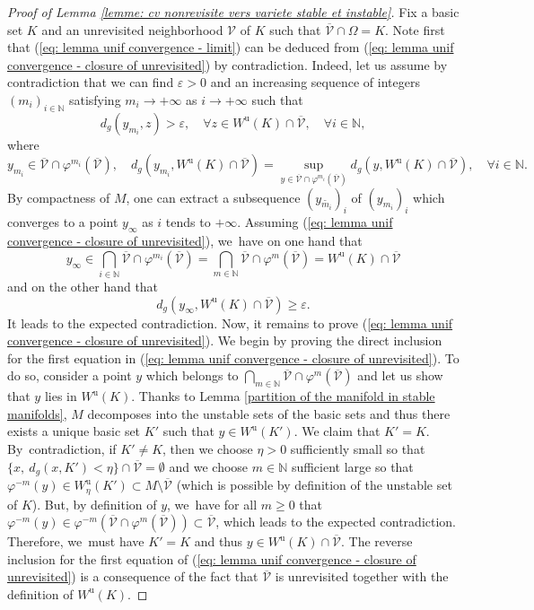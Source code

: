 \documentclass[JEP,XML,SOM,Unicode,NoEqCountersInSection,NoFloatCountersInSection,published]{cedram}
\newcommand{\ru}{\mathrm{u}}
\theoremstyle{definition}
\theoremstyle{plain}
\newcommand{\N}{\mathbb{N}}
\newcommand{\Vcal}{\mathcal{V}}
\begin{document}
\begin{proof}[Proof of Lemma \ref{lemme: cv nonrevisite vers variete stable et instable}]
Fix a basic set $K$ and an unrevisited neighborhood $\Vcal$ of $K$ such that $\overline{\Vcal} \cap \Omega = K$. Note first that (\ref{eq: lemma unif convergence - limit}) can be deduced from (\ref{eq: lemma unif convergence - closure of unrevisited}) by contradiction. Indeed, let us assume by contradiction that we can find $\varepsilon > 0$ and an increasing sequence of integers $(m_i)_{i \in \N}$ satisfying $m_i \to +\infty$ as $i \to +\infty$ such that
\[
d_g (y_{m_i},z) > \varepsilon, \quad \forall z \in W^\ru (K) \cap \overline{\Vcal}, \quad \forall i \in \N,
\]
where
\[
y_{m_i} \in \overline{\Vcal} \cap \varphi^{m_i} (\overline{\Vcal}), \quad d_g (y_{m_i},W^{\ru} (K) \cap \overline{\Vcal}) = \sup_{y \in \overline{\Vcal} \cap \varphi^{m_i} (\overline{\Vcal})} d_g \left(y, W^{\ru} (K) \cap \overline{\Vcal} \right), \quad \forall i \in \N.
\]
By compactness of $M$, one can extract a subsequence $(y_{\widetilde{m_i}})_i$ of $(y_{m_i})_i$ which converges to a point $y_{\infty}$ as $i$ tends to $+\infty$. Assuming (\ref{eq: lemma unif convergence - closure of unrevisited}), we~have on one hand that
\[
y_{\infty} \in \bigcap_{i \in \N} \overline{\Vcal} \cap \varphi^{m_i} (\overline{\Vcal}) = \bigcap_{m \in \N} \overline{\Vcal} \cap \varphi^{m} (\overline{\Vcal}) = W^\ru (K) \cap \overline{\Vcal}
\]
and on the other hand that
\[
d_g (y_{\infty}, W^\ru (K) \cap \overline{\Vcal}) \geq \varepsilon.
\]
It leads to the expected contradiction. Now, it remains to prove (\ref{eq: lemma unif convergence - closure of unrevisited}). We begin by proving the direct inclusion for the first equation in (\ref{eq: lemma unif convergence - closure of unrevisited}). To do so, consider a point $y$ which belongs to $\bigcap_{m \in \N} \overline{\Vcal} \cap \varphi^m (\overline{\Vcal})$ and let us show that $y$ lies in $W^\ru (K)$. Thanks to Lemma \ref{partition of the manifold in stable manifolds}, $M$ decomposes into the unstable sets of the basic sets and thus there exists a unique basic set $K'$ such that $ y \in W^\ru (K')$. We claim that $K' = K$. By~contradiction, if $K' \neq K$, then we choose $\eta > 0$ sufficiently small so that $\{x, \: d_g(x,K') < \eta\} \cap \overline{\Vcal} = \emptyset$ and we choose $m \in \N$ sufficient large so that $\varphi^{-m} (y) \in W_{\eta}^\ru (K') \subset M \setminus \overline{\Vcal}$ (which is possible by definition of the unstable set of $K$). But, by definition of $y$, we~have for all $m \geq 0$ that $\varphi^{-m} (y) \in \varphi^{-m} (\overline{\Vcal} \cap \varphi^m (\overline{\Vcal})) \subset \overline{\Vcal}$, which leads to the expected contradiction. Therefore, we~must have $K' = K$ and thus $y \in W^\ru (K) \cap \overline{\Vcal}$. The reverse inclusion for the first equation of (\ref{eq: lemma unif convergence - closure of unrevisited}) is a consequence of the fact that $\overline{\Vcal}$ is unrevisited together with the definition of $W^\ru (K)$.


\end{proof}
\end{document}
